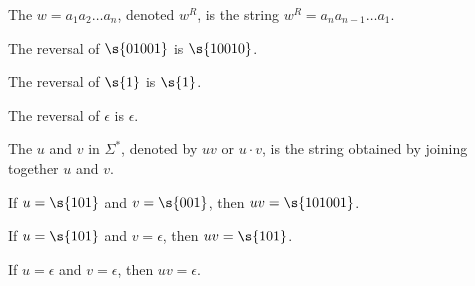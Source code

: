 \begin{flex}
\begin{definition} \label{definition:Reversal-of-a-string}
The  $w = a_1a_2\ldots a_n$, denoted $w^R$, is the string $w^R = a_na_{n-1}\ldots a_1$.
\end{definition}

\begin{example}[Reversal of $01001$] \label{example:Reversal-of-01001}
The reversal of $\s{01001}$ is $\s{10010}$.
\end{example}
\begin{example}[Reversal of $1$] \label{example:Reversal-of-1}
The reversal of $\s{1}$ is $\s{1}$.
\end{example}

\begin{example} \label{example:Reversal-of-epsilon}
The reversal of $\epsilon$ is $\epsilon$.
\end{example}
\end{flex}

\begin{flex}
\begin{definition} \label{definition:Concatenation-of-strings}
The  $u$ and $v$ in $\Sigma^*$, denoted by $uv$ or $u \cdot v$, is the string obtained by joining together $u$ and $v$. 
\end{definition}

\begin{example} \label{example:Concatenation-of-101-and-001}
If $u = \s{101}$ and $v = \s{001}$, then $uv = \s{101001}$.
\end{example}
\begin{example} \label{example:Concatenation-of-101-and-epsilon}
If $u = \s{101}$ and $v = \epsilon$, then $uv = \s{101}$.
\end{example}

\begin{example} \label{example:Concatenation-of-epsilon-and-epsilon}
If $u = \epsilon$ and $v = \epsilon$, then $uv = \epsilon$.
\end{example}
\end{flex}


